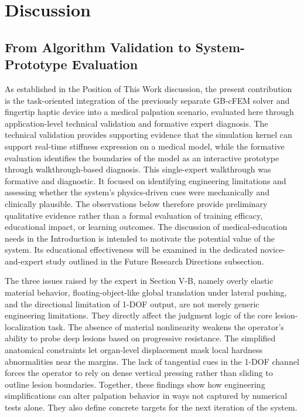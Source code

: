\documentclass{ieeeaccess}
\begin{document}
\section{Discussion}

\subsection{From Algorithm Validation to System-Prototype Evaluation}
As established in the Position of This Work discussion, the present contribution is the task-oriented integration of the previously separate GB-cFEM solver and fingertip haptic device into a medical palpation scenario, evaluated here through application-level technical validation and formative expert diagnosis. The technical validation provides supporting evidence that the simulation kernel can support real-time stiffness expression on a medical model, while the formative evaluation identifies the boundaries of the model as an interactive prototype through walkthrough-based diagnosis.
This single-expert walkthrough was formative and diagnostic. It focused on identifying engineering limitations and assessing whether the system’s physics-driven cues were mechanically and clinically plausible. The observations below therefore provide preliminary qualitative evidence rather than a formal evaluation of training efficacy, educational impact, or learning outcomes. The discussion of medical-education needs in the Introduction is intended to motivate the potential value of the system. Its educational effectiveness will be examined in the dedicated novice-and-expert study outlined in the Future Research Directions subsection.

The three issues raised by the expert in Section V-B, namely overly elastic material behavior, floating-object-like global translation under lateral pushing, and the directional limitation of 1-DOF output, are not merely generic engineering limitations. They directly affect the judgment logic of the core lesion-localization task. The absence of material nonlinearity weakens the operator's ability to probe deep lesions based on progressive resistance. The simplified anatomical constraints let organ-level displacement mask local hardness abnormalities near the margins. The lack of tangential cues in the 1-DOF channel forces the operator to rely on dense vertical pressing rather than sliding to outline lesion boundaries. Together, these findings show how engineering simplifications can alter palpation behavior in ways not captured by numerical tests alone. They also define concrete targets for the next iteration of the system.
\end{document}
